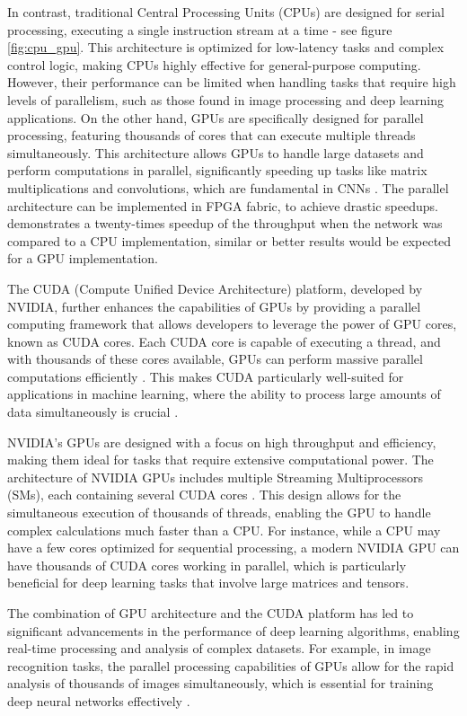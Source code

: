 In contrast, traditional Central Processing Units (CPUs) are designed for serial processing, executing a single instruction stream at a time - see figure \ref{fig:cpu_gpu}. This architecture is optimized for low-latency tasks and complex control logic, making CPUs highly effective for general-purpose computing. However, their performance can be limited when handling tasks that require high levels of parallelism, such as those found in image processing and deep learning applications. 
On the other hand, GPUs are specifically designed for parallel processing, featuring thousands of cores that can execute multiple threads simultaneously. 
This architecture allows GPUs to handle large datasets and perform computations in parallel, significantly speeding up tasks like matrix multiplications and convolutions, which are fundamental in CNNs \cite{15}.
The parallel architecture can be implemented in FPGA fabric, to achieve drastic speedups.
\cite{10} demonstrates a twenty-times speedup of the throughput when the network was compared to a CPU implementation, similar or better results would be expected for a GPU implementation.

The CUDA (Compute Unified Device Architecture) platform, developed by NVIDIA, further enhances the capabilities of GPUs by providing a parallel computing framework that allows developers to leverage the power of GPU cores, known as CUDA cores. Each CUDA core is capable of executing a thread, and with thousands of these cores available, GPUs can perform massive parallel computations efficiently \cite{4}. This makes CUDA particularly well-suited for applications in machine learning, where the ability to process large amounts of data simultaneously is crucial \cite{22}. 

NVIDIA's GPUs are designed with a focus on high throughput and efficiency, making them ideal for tasks that require extensive computational power. The architecture of NVIDIA GPUs includes multiple Streaming Multiprocessors (SMs), each containing several CUDA cores \cite{4}. This design allows for the simultaneous execution of thousands of threads, enabling the GPU to handle complex calculations much faster than a CPU. For instance, while a CPU may have a few cores optimized for sequential processing, a modern NVIDIA GPU can have thousands of CUDA cores working in parallel, which is particularly beneficial for deep learning tasks that involve large matrices and tensors.

The combination of GPU architecture and the CUDA platform has led to significant advancements in the performance of deep learning algorithms, enabling real-time processing and analysis of complex datasets. 
For example, in image recognition tasks, the parallel processing capabilities of GPUs allow for the rapid analysis of thousands of images simultaneously, which is essential for training deep neural networks effectively \cite{16}.

